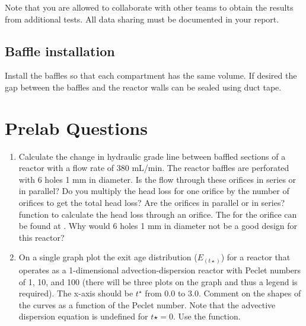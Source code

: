 \documentclass[letterpaper,10pt,english]{sphinxmanual}
\begin{document}
Note that you are allowed to collaborate with other teams to obtain the results from additional tests. All data sharing must be documented in your report.


\subsection{Baffle installation}
\label{\detokenize{Reactor_Characteristics/Reactor_Characteristics:baffle-installation}}
Install the baffles so that each compartment has the same volume. If desired the gap between the baffles and the reactor walls can be sealed using duct tape.


\section{Prelab Questions}
\label{\detokenize{Reactor_Characteristics/Reactor_Characteristics:prelab-questions}}\label{\detokenize{Reactor_Characteristics/Reactor_Characteristics:heading-reactor-pre-laboratory-questions}}\begin{enumerate}
\item {} 
Calculate the change in hydraulic grade line between baffled sections of a reactor with a flow rate of 380 mL/min. The reactor baffles are perforated with 6 holes 1 mm in diameter. Is the flow through these orifices in series or in parallel? Do you multiply the head loss for one orifice by the number of orifices to get the total head loss? Are the orifices in parallel or in series?  function to calculate the head loss through an orifice. The  for the orifice can be found at . Why would 6 holes 1 mm in diameter not be a good design for this reactor?

\item {} 
On a single graph plot the exit age distribution (\(E_{(t\star)}\)) for a reactor that operates as a 1-dimensional advection-dispersion reactor with Peclet numbers of 1, 10, and 100 (there will be three plots on the graph and thus a legend is required). The x-axis should be \(t^\star\) from 0.0 to 3.0. Comment on the shapes of the curves as a function of the Peclet number. Note that the advective dispersion equation is undefined for \(t\star = 0\). Use the  function.

\end{enumerate}
\end{document}
